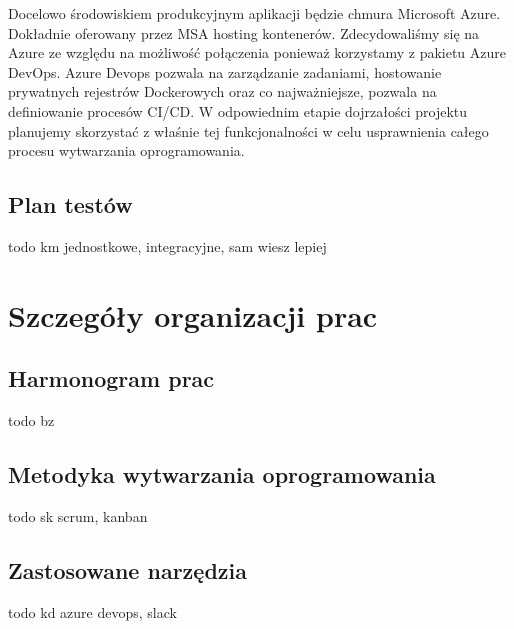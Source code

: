 \documentclass[10pt, titlepage, oneside, a4paper]{article}
\begin{document}
	Docelowo środowiskiem produkcyjnym aplikacji będzie chmura Microsoft Azure. Dokładnie oferowany przez MSA hosting
	kontenerów. Zdecydowaliśmy się na Azure ze względu na możliwość połączenia ponieważ korzystamy z pakietu Azure DevOps. 
	Azure Devops pozwala na zarządzanie zadaniami, hostowanie prywatnych rejestrów Dockerowych oraz co najważniejsze,
	pozwala na definiowanie procesów CI/CD. W odpowiednim etapie dojrzałości projektu planujemy skorzystać z właśnie
	tej funkcjonalności w celu usprawnienia całego procesu wytwarzania oprogramowania.

	  
	\subsection{Plan testów}
	todo km jednostkowe, integracyjne, sam wiesz lepiej
 
	\section{Szczegóły organizacji prac}  
 
	\subsection{Harmonogram prac}
	todo bz
 
	\subsection{Metodyka wytwarzania oprogramowania}
	todo sk scrum, kanban
	
	\subsection{Zastosowane narzędzia}
	todo kd azure devops, slack
 
\end{document}
